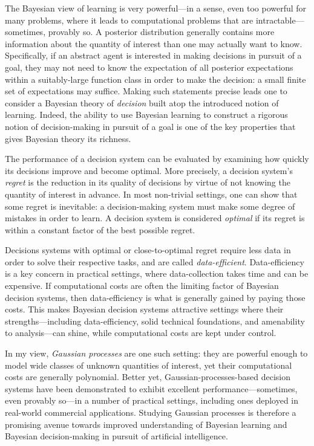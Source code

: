 \documentclass[11pt]{book}
\begin{document}
The Bayesian view of learning is very powerful---in a sense, even too powerful for many problems, where it leads to computational problems that are intractable---sometimes, provably so.
A posterior distribution generally contains more information about the quantity of interest than one may actually want to know.
Specifically, if an abstract agent is interested in making decisions in pursuit of a goal, they may not need to know the expectation of all posterior expectations within a suitably-large function class in order to make the decision: a small finite set of expectations may suffice.
Making such statements precise leads one to consider a Bayesian theory of \emph{decision} built atop the introduced notion of learning.
Indeed, the ability to use Bayesian learning to construct a rigorous notion of decision-making in pursuit of a goal is one of the key properties that gives Bayesian theory its richness.

The performance of a decision system can be evaluated by examining how quickly its decisions improve and become optimal.
More precisely, a decision system's \emph{regret} is the reduction in its quality of decisions by virtue of not knowing the quantity of interest in advance.
In most non-trivial settings, one can show that some regret is inevitable: a decision-making system must make some degree of mistakes in order to learn.
A decision system is considered \emph{optimal} if its regret is within a constant factor of the best possible regret.

Decisions systems with optimal or close-to-optimal regret require less data in order to solve their respective tasks, and are called \emph{data-efficient}.
Data-efficiency is a key concern in practical settings, where data-collection takes time and can be expensive.
If computational costs are often the limiting factor of Bayesian decision systems, then data-efficiency is what is generally gained by paying those costs.
This makes Bayesian decision systems attractive settings where their strengths---including data-efficiency, solid technical foundations, and amenability to analysis---can shine, while computational costs are kept under control.

In my view, \emph{Gaussian processes} are one such setting: they are powerful enough to model wide classes of unknown quantities of interest, yet their computational costs are generally polynomial.
Better yet, Gaussian-processes-based decision systems have been demonstrated to exhibit excellent performance---sometimes, even provably so---in a number of practical settings, including ones deployed in real-world commercial applications.
Studying Gaussian processes is therefore a promising avenue towards improved understanding of Bayesian learning and Bayesian decision-making in pursuit of artificial intelligence.
\end{document}
